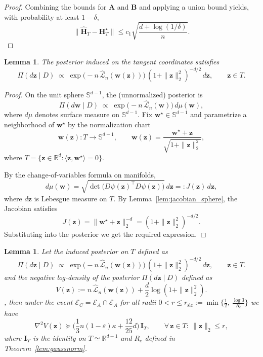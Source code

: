 \documentclass{article}
\theoremstyle{plain}
\newtheorem{lemma}[theorem]{Lemma}
\theoremstyle{definition}
\theoremstyle{remark}
\begin{document}
{\begin{proof}
Combining the bounds for $\mathbf A$ and $\mathbf B$ and applying a union
bound yields, with probability at least $1-\delta$,
\[
\bigl\|\widehat{\mathbf H}_T-\mathbf H_T^\star\bigr\|
\le
c_{1}\sqrt{\frac{d+\log(1/\delta)}{n}}.
\]
\end{proof}

\begin{lemma}
\label{lem:posterior_tangent}
The posterior induced on the tangent coordinates satisfies
\[
\Pi(d\mathbf z \mid D)
\;\propto\;
\exp\!\big(-n\,\widehat{\mathcal L}_n(\mathbf{w}(\mathbf z))\big)\,
(1+\|\mathbf z\|_2^2)^{-d/2}\,d\mathbf z,
\qquad
\mathbf z\in T.
\]
\end{lemma}

\begin{proof}
On the unit sphere $\mathbb S^{d-1}$, the (unnormalized) posterior is
\[
\Pi(d\mathbf w\mid D)
\;\propto\;
\exp\!\big(-n\,\widehat{\mathcal L}_n(\mathbf w)\big)\,d\mu(\mathbf w),
\]
where $d\mu$ denotes surface  measure on $\mathbb S^{d-1}$.
Fix $\mathbf w^\star\in\mathbb S^{d-1}$ and parametrize a neighborhood of
$\mathbf w^\star$ by the normalization chart
\[
\mathbf{w}(\mathbf{z}):T\to\mathbb S^{d-1},
\qquad
\mathbf{w}(\mathbf{z})=\frac{\mathbf w^\star+\mathbf z}{\sqrt{1+\|\mathbf z\|_2^2}},
\]
where
$T=\{\mathbf z\in\mathbb R^d:\langle \mathbf z,\mathbf w^\star\rangle=0\}$.

By the change-of-variables formula on manifolds,
\[
d\mu(\mathbf w)
=
\sqrt{\det\!\big(D\psi(\mathbf z)^\top D\psi(\mathbf z)\big)}\,d\mathbf z
=: J(\mathbf z)\,d\mathbf z,
\]
where $d\mathbf z$ is Lebesgue measure on $T$.
By Lemma~\ref{lem:jacobian_sphere}, the Jacobian satisfies
\[
J(\mathbf z)=\|\mathbf w^\star+\mathbf z\|_2^{-d}
=(1+\|\mathbf z\|_2^2)^{-d/2}.
\]
Substituting into the posterior we get the required expression.
\end{proof}



\begin{lemma}
\label{lem:local_slc_tangent}
Let the induced posterior on $T$ defined as 
\[
\Pi(d\mathbf z \mid D)\;\propto\;\exp\!\big(-n\,\widehat{\mathcal L}_n(\mathbf{w}(\mathbf{z}))\big)\,(1+\|\mathbf z\|_2^2)^{-d/2}\,d\mathbf z,
\qquad \mathbf z\in T.
\]
and the negative log-density of the posterior $\Pi(d\mathbf z \mid D)$  defined as
\[
V(\mathbf z):=n\,\widehat{\mathcal L}_n(\mathbf{w}(\mathbf{z}))+\frac{d}{2}\log(1+\|\mathbf z\|_2^2).
\],
then under the event $\mathcal{E}_{C}=\mathcal{E}_{A} \cap \mathcal{E}_{A}$ for all radii $0<r\le r_{\mathrm{slc}}
:=\min\Big\{\frac12,\ \frac{\log 3}{R_{e}}\Big\}$
we have
\[
\nabla^2 V(\mathbf z)\succeq
\Big(\frac{1}{3}n(1-\varepsilon)\kappa+\frac{12}{25}d\Big)\,\mathbf I_T,
\qquad
\forall\,\mathbf z\in T:\ \|\mathbf z\|_2\le r,
\]
where $\mathbf I_T$ is the identity on $T\simeq\mathbb R^{d-1}$ and $R_{e}$ defined in Theorem~\ref{lem:gaussnorm}. 
\end{lemma}

}
\end{document}
